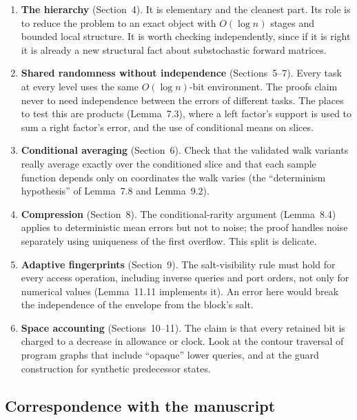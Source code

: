 \documentclass[11pt]{article}
\theoremstyle{definition}
\theoremstyle{remark}
\begin{document}
\begin{enumerate}
\item \textbf{The hierarchy} (Section~4). It is elementary and the cleanest part.
  Its role is to reduce the problem to an exact object with $O(\log n)$ stages and
  bounded local structure. It is worth checking independently, since if it is
  right it is already a new structural fact about substochastic forward matrices.
\item \textbf{Shared randomness without independence} (Sections~5--7). Every
  task at every level uses the same $O(\log n)$-bit environment. The proofs claim
  never to need independence between the errors of different tasks. The places to
  test this are products (Lemma~7.3), where a left factor's support is used to
  sum a right factor's error, and the use of conditional means on slices.
\item \textbf{Conditional averaging} (Section~6). Check that the validated
  walk variants really average exactly over the conditioned slice and that each
  sample function depends only on coordinates the walk varies (the
  ``determinism hypothesis'' of Lemma~7.8 and Lemma~9.2).
\item \textbf{Compression} (Section~8). The conditional-rarity argument
  (Lemma~8.4) applies to deterministic mean errors but not to noise; the proof
  handles noise separately using uniqueness of the first overflow. This split is
  delicate.
\item \textbf{Adaptive fingerprints} (Section~9). The salt-visibility rule must
  hold for every access operation, including inverse queries and port orders, not
  only for numerical values (Lemma~11.11 implements it). An error here would
  break the independence of the envelope from the block's salt.
\item \textbf{Space accounting} (Sections~10--11). The claim is that every
  retained bit is charged to a decrease in allowance or clock. Look at the
  contour traversal of program graphs that include ``opaque'' lower queries, and
  at the guard construction for synthetic predecessor states.
\end{enumerate}

\subsection{Correspondence with the manuscript}
\end{document}

